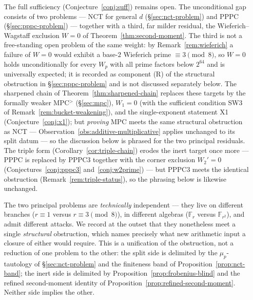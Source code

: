 \documentclass[11pt]{amsart}
\theoremstyle{plain}
\theoremstyle{definition}
\theoremstyle{remark}
\numberwithin{equation}{section}
\newcommand{\F}{\mathbb{F}}
\begin{document}
The full sufficiency (Conjecture~\ref{conj:suff}) remains open. The unconditional gap consists of two problems --- NCT for general $d$ (\S\ref{sec:nct-problem}) and PPPC (\S\ref{sec:pppc-problem}) --- together with a third, far milder residual, the Wieferich--Wagstaff exclusion $W = 0$ of Theorem~\ref{thm:second-moment}. The third is not a free-standing open problem of the same weight: by Remark~\ref{rem:wieferich} a failure of $W = 0$ would exhibit a base-$2$ Wieferich prime $\equiv 3 \pmod 8$, so $W = 0$ holds unconditionally for every $W_p$ with all prime factors below $2^{64}$ \cite{ref:OEISWieferich} and is universally expected; it is recorded as component (R) of the structural obstruction in \S\ref{sec:pppc-problem} and is not discussed separately below. The sharpened chain of Theorem~\ref{thm:sharpened-chain} replaces these targets by the formally weaker MPC$^{>}$ (\S\ref{sec:mpc}), $W_1 = 0$ (with the sufficient condition SW3 of Remark~\ref{rem:bucket-weakening}), and the single-exponent statement X1 (Conjecture~\ref{conj:x1}); but \emph{proving} MPC meets the same structural obstruction as NCT --- Observation~\ref{obs:additive-multiplicative} applies unchanged to its split datum --- so the discussion below is phrased for the two principal residuals. The triple form (Corollary~\ref{cor:triple-chain}) erodes the inert target once more --- PPPC is replaced by PPPC3 together with the corner exclusion $W_2' = 0$ (Conjectures~\ref{conj:pppc3} and~\ref{conj:w2prime}) --- but PPPC3 meets the identical obstruction (Remark~\ref{rem:triple-status}), so the phrasing below is likewise unchanged.

The two principal problems are \emph{technically} independent --- they live on different branches ($r \equiv 1$ versus $r \equiv 3 \pmod 8$), in different algebras ($\F_r$ versus $\F_{r^2}$), and admit different attacks. We record at the outset that they nonetheless meet a single \emph{structural} obstruction, which names precisely what new arithmetic input a closure of either would require. This is a unification of the obstruction, not a reduction of one problem to the other: the split side is delimited by the $\mu_p$-tautology of \S\ref{sec:nct-problem} and the finiteness band of Proposition~\ref{prop:nct-band}; the inert side is delimited by Proposition~\ref{prop:frobenius-blind} and the refined second-moment identity of Proposition~\ref{prop:refined-second-moment}. Neither side implies the other.
\end{document}
